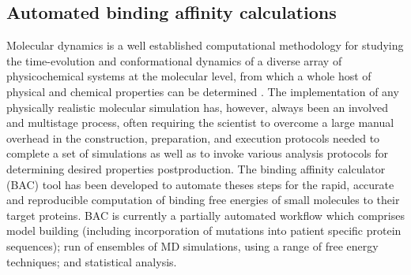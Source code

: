 \subsection{Automated binding affinity calculations}

Molecular dynamics is a well established computational methodology for studying the time-evolution and conformational dynamics of a diverse array of physicochemical systems at the molecular level, from which a whole host of physical and chemical properties can be determined \cite{Karplus2005}. 
The implementation of any physically realistic molecular simulation has, however, always been an involved and multistage process, often requiring the scientist to overcome a large manual overhead in the construction, preparation, and execution protocols needed to complete a set of simulations as well as to invoke various analysis protocols for determining desired properties postproduction.
The binding affinity calculator (BAC) \cite{Sadiq2008} tool has been developed to automate theses steps for the rapid, accurate and reproducible computation of binding free energies of small molecules to their target proteins.
BAC is currently a partially automated workflow which comprises model building (including incorporation of mutations into patient specific protein sequences); run of ensembles of MD simulations, using a range of free energy techniques; and statistical analysis.

